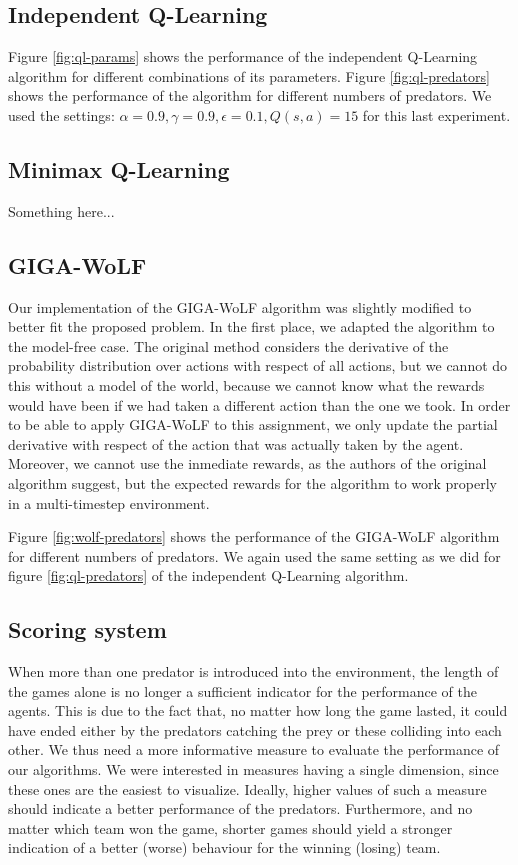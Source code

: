 \documentclass[a4paper,12pt]{article}
\begin{document}
\subsection{Independent Q-Learning}

Figure \ref{fig:ql-params} shows the performance of the independent Q-Learning algorithm for different combinations of its parameters. Figure \ref{fig:ql-predators} shows the performance of the algorithm for different numbers of predators. We used the settings: $\alpha = 0.9, \gamma = 0.9, \epsilon = 0.1, Q(s, a) = 15$ for this last experiment.

\subsection{Minimax Q-Learning}

Something here...

\subsection{GIGA-WoLF}

Our implementation of the GIGA-WoLF algorithm was slightly modified to better fit the proposed problem. In the first place, we adapted the algorithm to the model-free case. The original method considers the derivative of the probability distribution over actions with respect of all actions, but we cannot do this without a model of the world, because we cannot know what the rewards would have been if we had taken a different action than the one we took. In order to be able to apply GIGA-WoLF to this assignment, we only update the partial derivative with respect of the action that was actually taken by the agent. Moreover, we cannot use the inmediate rewards, as the authors of the original algorithm suggest, but the expected rewards for the algorithm to work properly in a multi-timestep environment.

Figure \ref{fig:wolf-predators} shows the performance of the GIGA-WoLF algorithm for different numbers of predators. We again used the same setting as we did for figure \ref{fig:ql-predators} of the independent Q-Learning algorithm.

\subsection{Scoring system}

When more than one predator is introduced into the environment, the length of the games alone is no longer a sufficient indicator for the performance of the agents. This is due to the fact that, no matter how long the game lasted, it could have ended either by the predators catching the prey or these colliding into each other. We thus need a more informative measure to evaluate the performance of our algorithms. We were interested in measures having a single dimension, since these ones are the easiest to visualize. Ideally, higher values of such a measure should indicate a better performance of the predators. Furthermore, and no matter which team won the game, shorter games should yield a stronger indication of a better (worse) behaviour for the winning (losing) team.
\end{document}
